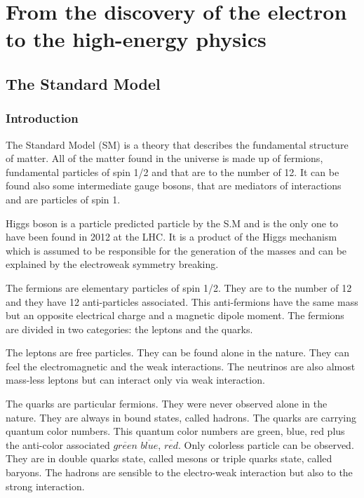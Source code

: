 \chapter{From the discovery of the electron to the high-energy physics}

  \section{The Standard Model}

    \subsection{Introduction}
    
    The Standard Model (SM) is a theory that describes the fundamental structure of matter. 
    All of the matter found in the universe is made up of fermions, fundamental particles of spin 1/2 and that are to the number of 12.
    It can be found also some intermediate gauge bosons, that are mediators of interactions and are particles of spin 1. 

    Higgs boson is a particle predicted particle by the S.M and is the only one to have been found in 2012 at the LHC. It is a product of the Higgs mechanism which is assumed to be responsible for the generation of the masses and can be explained by the electroweak symmetry breaking.
    
    The fermions are elementary particles of spin 1/2. They are to the number of 12 and they have 12 anti-particles associated.  This anti-fermions have the same mass but an opposite electrical charge and a magnetic dipole moment. The fermions are divided in two categories: the leptons and the quarks.
    
    The leptons are free particles. They can be found alone in the nature. They can feel the electromagnetic and the weak interactions. The neutrinos are also almost mass-less leptons but can interact only via weak interaction.
    
    The quarks are particular fermions. They were never observed alone in the nature. They are always in bound states, called hadrons. The quarks are carrying quantum color numbers. This quantum color numbers are green, blue, red plus the anti-color associated $\overline{green}$ $\overline{blue}$, $\overline{red}$. Only colorless particle can be observed. They are in double quarks state, called mesons or triple quarks state, called baryons. The hadrons are sensible to the electro-weak interaction but also to the strong interaction.
    
